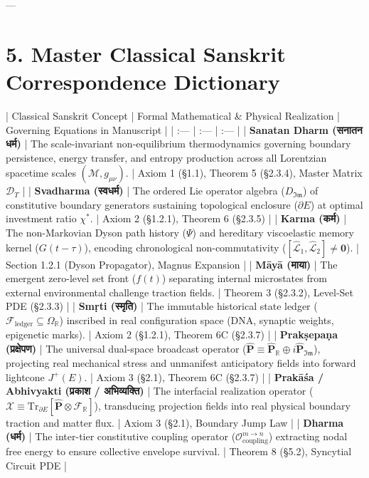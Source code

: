 \documentclass[11pt,a4paper]{article}
\theoremstyle{definition}
\theoremstyle{remark}
\begin{document}
---

\section{5. Master Classical Sanskrit Correspondence Dictionary}

| Classical Sanskrit Concept | Formal Mathematical \& Physical Realization | Governing Equations in Manuscript |
| :--- | :--- | :--- |
| \textbf{Sanatan Dharm (सनातन धर्म)} | The scale-invariant non-equilibrium thermodynamics governing boundary persistence, energy transfer, and entropy production across all Lorentzian spacetime scales $(\mathcal{M}, g_{\mu\nu})$. | Axiom 1 (§1.1), Theorem 5 (§2.3.4), Master Matrix $\mathcal{D}_T$ |
| \textbf{Svadharma (स्वधर्म)} | The ordered Lie operator algebra ($D_{\mathfrak{Im}}$) of constitutive boundary generators sustaining topological enclosure ($\partial E$) at optimal investment ratio $\chi^*$. | Axiom 2 (§1.2.1), Theorem 6 (§2.3.5) |
| \textbf{Karma (कर्म)} | The non-Markovian Dyson path history ($\Psi$) and hereditary viscoelastic memory kernel ($G(t-\tau)$), encoding chronological non-commutativity ($[\hat{\mathcal{L}}_1, \hat{\mathcal{L}}_2] \neq \mathbf{0}$). | Section 1.2.1 (Dyson Propagator), Magnus Expansion |
| \textbf{Māyā (माया)} | The emergent zero-level set front ($f(t)$) separating internal microstates from external environmental challenge traction fields. | Theorem 3 (§2.3.2), Level-Set PDE (§2.3.3) |
| \textbf{Smṛti (स्मृति)} | The immutable historical state ledger ($\mathcal{F}_{\text{ledger}} \subseteq \Omega_{\mathbb{R}}$) inscribed in real configuration space (DNA, synaptic weights, epigenetic marks). | Axiom 2 (§1.2.1), Theorem 6C (§2.3.7) |
| \textbf{Prakṣepaṇa (प्रक्षेपण)} | The universal dual-space broadcast operator ($\hat{\mathbf{P}} \equiv \hat{\mathbf{P}}_{\mathbb{R}} \oplus i \hat{\mathbf{P}}_{\mathfrak{Im}}$), projecting real mechanical stress and unmanifest anticipatory fields into forward lightcone $J^+(E)$. | Axiom 3 (§2.1), Theorem 6C (§2.3.7) |
| \textbf{Prakāśa / Abhivyakti (प्रकाश / अभिव्यक्ति)} | The interfacial realization operator ($\boldsymbol{\mathcal{X}} \equiv \mathrm{Tr}_{\partial E}[\hat{\mathbf{P}} \otimes \mathcal{F}_{\mathbb{R}}]$), transducing projection fields into real physical boundary traction and matter flux. | Axiom 3 (§2.1), Boundary Jump Law |
| \textbf{Dharma (धर्म)} | The inter-tier constitutive coupling operator ($\mathcal{O}_{\text{coupling}}^{m \to n}$) extracting nodal free energy to ensure collective envelope survival. | Theorem 8 (§5.2), Syncytial Circuit PDE |
\end{document}
